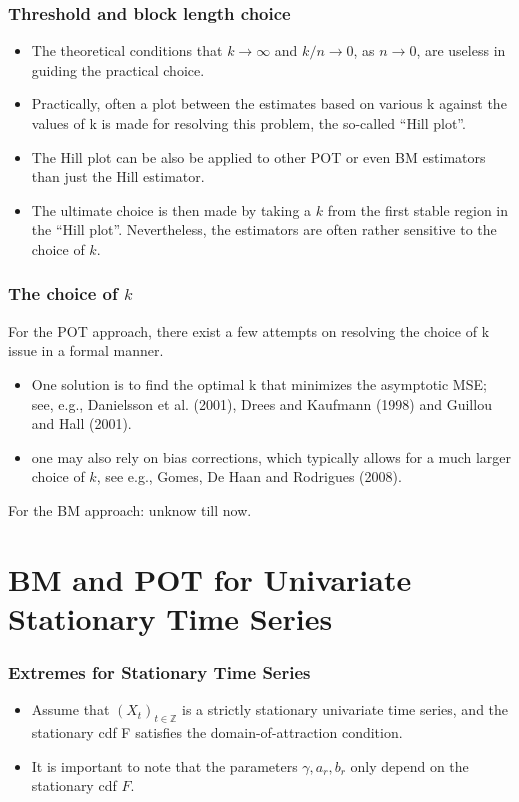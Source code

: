 \documentclass{beamer}
\newcommand{\suit}[1]{\left(#1\right)}
\begin{document}
\begin{frame}
    \frametitle{Threshold and block length choice}

    \begin{itemize}
        \item The theoretical conditions that $k\to \infty$ and $k/n\to 0$, as $n \to 0$, are useless in guiding the practical choice. 
        \item Practically, often a plot between the estimates based on various k against the values
        of k is made for resolving this problem, the so-called “Hill plot”.
        \item The Hill plot can be also be applied to other POT or even BM estimators than
        just the Hill estimator.
        \item The ultimate choice is then made by taking a $k$ from the first stable
        region in the “Hill plot”. Nevertheless, the estimators are often rather sensitive to the choice of $k$.
    \end{itemize}

\end{frame}

\begin{frame}
    \frametitle{The choice of $k$}
    For the POT approach, there exist a few attempts on resolving the choice of k issue in a formal manner.
\begin{itemize}
    \item One solution is to find the optimal k that minimizes the asymptotic MSE; see, e.g., Danielsson et al. (2001), Drees and Kaufmann (1998) and Guillou and Hall (2001).
    \item one may also rely on bias corrections, which typically allows
    for a much larger choice of $k$, see e.g., Gomes, De Haan and Rodrigues (2008).
\end{itemize}
\medskip

For the BM approach: unknow till now.

\end{frame}




\section{BM and POT for Univariate Stationary Time Series}
\begin{frame}
    \frametitle{Extremes for Stationary Time Series}
\begin{itemize}
    \item Assume that $\suit{X_t}_{t\in \mathbb{Z}}$ is a strictly stationary univariate time series, and the
    stationary cdf F satisfies the domain-of-attraction condition.
    \bigskip
    \item It is important to note that
    the parameters $\gamma,a_r,b_r$ only depend on the stationary cdf $F$.
\end{itemize}
    

\end{frame}
\end{document}
